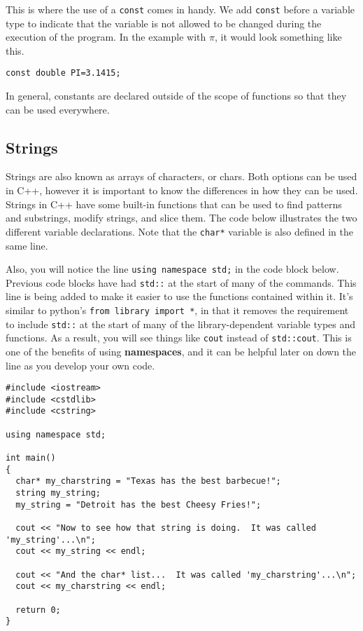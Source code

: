 This is where the use of a \texttt{const} comes in handy.  We add \texttt{const} before a variable type to indicate that the variable is not allowed to be changed during the execution of the program.  In the example with $\pi$, it would look something like this.

\begin{verbatim}
const double PI=3.1415;
\end{verbatim}

In general, constants are declared outside of the scope of functions so that they can be used everywhere.

\subsection{Strings}
Strings are also known as arrays of characters, or chars.  Both options can be used in C++, however it is important to know the differences in how they can be used.
Strings in C++ have some built-in functions that can be used to find patterns and substrings, modify strings, and slice them.  The code below illustrates the two different variable declarations.  Note that the \texttt{char*} variable is also defined in the same line.

Also, you will notice the line \texttt{using namespace std;} in the code block below.  Previous code blocks have had \texttt{std::} at the start of many of the commands. This line is being added to make it easier to use the functions contained within it. It's similar to python's \texttt{from library import *}, in that it removes the requirement to include \texttt{std::} at the start of many of the library-dependent variable types and functions.  As a result, you will see things like \texttt{cout} instead of \texttt{std::cout}.  This is one of the benefits of using \textbf{namespaces}, and it can be helpful later on down the line as you develop your own code.

\begin{verbatim}
#include <iostream>
#include <cstdlib>
#include <cstring>

using namespace std;

int main()
{
  char* my_charstring = "Texas has the best barbecue!";
  string my_string;
  my_string = "Detroit has the best Cheesy Fries!";

  cout << "Now to see how that string is doing.  It was called 'my_string'...\n";
  cout << my_string << endl;

  cout << "And the char* list...  It was called 'my_charstring'...\n";
  cout << my_charstring << endl;

  return 0;
}
\end{verbatim}

